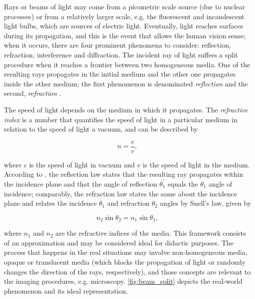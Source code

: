Rays or beams of light may come from a picometric scale source (due to nuclear processes) or from a relatively larger scale, e.g. the fluorescent and incandescent light bulbs, which are sources of electric light. Eventually, light reaches surfaces during its propagation, and this is the event that allows the human vision sense; when it occurs, there are four prominent phenomena to consider: reflection, refraction, interference and diffraction. The incident ray of light suffers a split procedure when it reaches a frontier between two homogeneous media. One of the resulting rays propagates in the initial medium and the other one propagates inside the other medium; the first phenomenon is denominated \emph{reflection} and the second, \emph{refraction} \cite{born1999principles}.

The speed of light depends on the medium in which it propagates. The \emph{refractive index} is a number that quantifies the speed of light in a particular medium in relation to the speed of light a vacuum, and can be described by

\begin{equation}
    \label{eqn:refractive_index}
       n = \frac{c}{v},
\end{equation}

\noindent where $\mathit{c}$ is the speed of light in vacuum and $\mathit{v}$ is the speed of light in the medium. According to , the reflection law states that the resulting ray propagates within the incidence plane and that the angle of reflection $\mathit{\theta^{'}_{1}}$ equals the $\mathit{\theta_{1}}$ angle of incidence; comparably, the refraction law states the same about the incidence plane and relates the incidence $\mathit{\theta_{1}}$ and refraction $\mathit{\theta_{2}}$ angles by Snell's law, given by

\begin{equation}
    \label{eqn:snells_law}
       n_{2}\sin{\theta_{2}} = n_{1}\sin{\theta_{1}},
\end{equation}

\noindent where $\mathit{n_{1}}$ and $\mathit{n_{2}}$ are the refractive indices of the media. This framework consists of an approximation and may be considered ideal for didactic purposes. The process that happens in the real situations may involve non-homogeneous media, opaque or translucent media (which blocks the propagation of light or randomly changes the direction of the rays, respectively), and those concepts are relevant to the imaging procedures, e.g. microscopy. \autoref{fig:beam_split} depicts the real-world phenomenon and its ideal representation.



